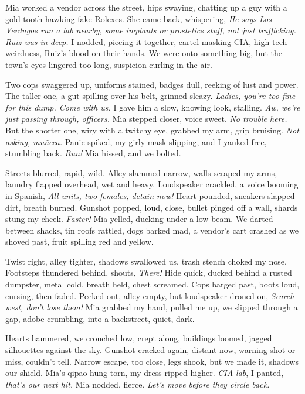 \documentclass[12pt,oneside]{book}
\begin{document}
Mia worked a vendor across the street, hips swaying, chatting up a guy with a gold tooth hawking fake Rolexes. She came back, whispering, \textit{He says Los Verdugos run a lab nearby, some implants or prostetics stuff, not just trafficking. Ruiz was in deep.} I nodded, piecing it together, cartel masking CIA, high-tech weirdness, Ruiz’s blood on their hands. We were onto something big, but the town’s eyes lingered too long, suspicion curling in the air.

Two cops swaggered up, uniforms stained, badges dull, reeking of lust and power. The taller one, a gut spilling over his belt, grinned sleazy. \textit{Ladies, you’re too fine for this dump. Come with us.} I gave him a slow, knowing look, stalling. \textit{Aw, we’re just passing through, officers.} Mia stepped closer, voice sweet. \textit{No trouble here.} But the shorter one, wiry with a twitchy eye, grabbed my arm, grip bruising. \textit{Not asking, muñeca.} Panic spiked, my girly mask slipping, and I yanked free, stumbling back. \textit{Run!} Mia hissed, and we bolted.

Streets blurred, rapid, wild. Alley slammed narrow, walls scraped my arms, laundry flapped overhead, wet and heavy. Loudspeaker crackled, a voice booming in Spanish, \textit{All units, two females, detain now!} Heart pounded, sneakers slapped dirt, breath burned. Gunshot popped, loud, close, bullet pinged off a wall, shards stung my cheek. \textit{Faster!} Mia yelled, ducking under a low beam. We darted between shacks, tin roofs rattled, dogs barked mad, a vendor’s cart crashed as we shoved past, fruit spilling red and yellow.

Twist right, alley tighter, shadows swallowed us, trash stench choked my nose. Footsteps thundered behind, shouts, \textit{There!} Hide quick, ducked behind a rusted dumpster, metal cold, breath held, chest screamed. Cops barged past, boots loud, cursing, then faded. Peeked out, alley empty, but loudspeaker droned on, \textit{Search west, don’t lose them!} Mia grabbed my hand, pulled me up, we slipped through a gap, adobe crumbling, into a backstreet, quiet, dark.

Hearts hammered, we crouched low, crept along, buildings loomed, jagged silhouettes against the sky. Gunshot cracked again, distant now, warning shot or miss, couldn’t tell. Narrow escape, too close, legs shook, but we made it, shadows our shield. Mia’s qipao hung torn, my dress ripped higher. \textit{CIA lab}, I panted, \textit{that’s our next hit.} Mia nodded, fierce. \textit{Let’s move before they circle back.}
\end{document}
